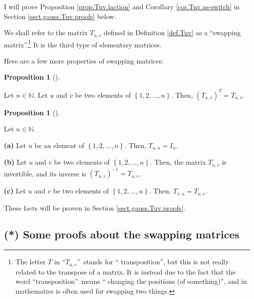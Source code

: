 \documentclass[numbers=enddot,12pt,final,onecolumn,notitlepage]{scrartcl}%
\theoremstyle{definition}
\newtheorem{prop}[theo]{Proposition}
\newenvironment{proposition}[1][]
{\begin{prop}[#1]\begin{leftbar}}
{\end{leftbar}\end{prop}}
\begin{document}
I will prove Proposition \ref{prop.Tuv.laction} and Corollary
\ref{cor.Tuv.as-switch} in Section \ref{sect.gauss.Tuv.proofs} below.

We shall refer to the matrix $T_{u,v}$ defined in Definition \ref{def.Tuv} as
a \textquotedblleft swapping matrix\textquotedblright.\footnote{The letter $T$
in \textquotedblleft$T_{u,v}$\textquotedblright\ stands for \textquotedblleft
transposition\textquotedblright, but this is not really related to the
transpose of a matrix. It is instead due to the fact that the word
\textquotedblleft transposition\textquotedblright\ means \textquotedblleft
changing the positions (of something)\textquotedblright, and in mathematics is
often used for swapping two things.} It is the third type of elementary matrices.

Here are a few more properties of swapping matrices:

\begin{proposition}
\label{prop.Tuv.transpose}Let $n\in\mathbb{N}$. Let $u$ and $v$ be two
elements of $\left\{  1,2,\ldots,n\right\}  $. Then, $\left(  T_{u,v}\right)
^{T}=T_{u,v}$.
\end{proposition}

\begin{proposition}
\label{prop.Tuv.lambda+mu}Let $n\in\mathbb{N}$.

\textbf{(a)} Let $u$ be an element of $\left\{  1,2,\ldots,n\right\}  $. Then,
$T_{u,u}=I_{n}$.

\textbf{(b)} Let $u$ and $v$ be two elements of $\left\{  1,2,\ldots
,n\right\}  $. Then, the matrix $T_{u,v}$ is invertible, and its inverse is
$\left(  T_{u,v}\right)  ^{-1}=T_{u,v}$.

\textbf{(c)} Let $u$ and $v$ be two elements of $\left\{  1,2,\ldots
,n\right\}  $. Then, $T_{v,u}=T_{u,v}$.
\end{proposition}

These facts will be proven in Section \ref{sect.gauss.Tuv.proofs}.

\subsection{\label{sect.gauss.Tuv.proofs}(*) Some proofs about the swapping
matrices}
\end{document}
